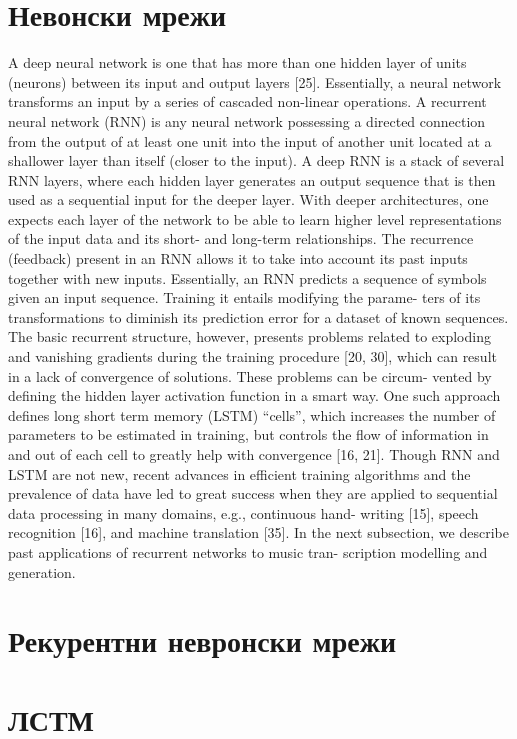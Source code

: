 \section{Невонски мрежи}

\cite{Sturm2016} A deep neural network is one that has more than one hidden layer of units (neurons) between its input and output layers [25]. Essentially, a neural network transforms an input by a series of cascaded non-linear operations. A recurrent neural network (RNN) is any neural network possessing a directed connection from the output of at least one unit into the input of another unit located at a shallower layer than itself (closer to the input). A deep RNN is a stack of several RNN layers, where each hidden layer generates an output sequence that is then used as a sequential input for the deeper layer. With deeper architectures, one expects each layer of the network to be able to learn higher level representations of the input data and its short- and long-term relationships.
The recurrence (feedback) present in an RNN allows it to take into account
its past inputs together with new inputs. Essentially, an RNN predicts a sequence of symbols given an input sequence. Training it entails modifying the parame- ters of its transformations to diminish its prediction error for a dataset of known sequences. The basic recurrent structure, however, presents problems related to exploding and vanishing gradients during the training procedure [20, 30], which can result in a lack of convergence of solutions. These problems can be circum- vented by defining the hidden layer activation function in a smart way. One such approach defines long short term memory (LSTM) “cells”, which increases the number of parameters to be estimated in training, but controls the flow of information in and out of each cell to greatly help with convergence [16, 21]. Though RNN and LSTM are not new, recent advances in efficient training
algorithms and the prevalence of data have led to great success when they are applied to sequential data processing in many domains, e.g., continuous hand- writing [15], speech recognition [16], and machine translation [35]. In the next subsection, we describe past applications of recurrent networks to music tran- scription modelling and generation.
  
\section{Рекурентни невронски мрежи}

\section{ЛСТМ}
 
